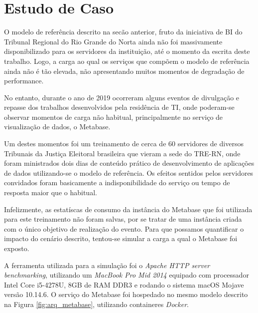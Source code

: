\section{Estudo de Caso}

O modelo de referência descrito na secão anterior, fruto da iniciativa de BI do Tribunal Regional do Rio Grande do Norta ainda não foi massivamente disponibilizado para os servidores da instituição, até o momento da escrita deste trabalho. Logo, a carga ao qual os serviços que compõem o modelo de referência ainda não é tão elevada, não apresentando muitos momentos de degradação de performance.

No entanto, durante o ano de 2019 ocorreram alguns eventos de divulgação e repasse dos trabalhos desenvolvidos pela residência de TI, onde poderam-se observar momentos de carga não habitual, principalmente no serviço de visualização de dados, o Metabase.

Um destes momentos foi um treinamento de cerca de 60 servidores de diversos Tribunais da Justiça Eleitoral brasileira que vieram a sede do TRE-RN, onde foram ministrados dois dias de conteúdo prático de desenvolvimento de aplicações de dados utilizando-se o modelo de referência. Os efeitos sentidos pelos servidores convidados foram basicamente a indisponibilidade do serviço ou tempo de resposta maior que o habitual.

Infelizmente, as estatíscas de consumo da instância do Metabase que foi utilizada para este treinamento não foram salvas, por se tratar de uma instância criada com o único objetivo de realização do evento. Para que possamos quantificar o impacto do cenário descrito, tentou-se simular a carga a qual o Metabase foi exposto.

A ferramenta utilizada para a simulação foi o \textit{Apache HTTP server benchmarking}, utilizando um \textit{MacBook Pro Mid 2014} equipado com processador Intel Core i5-4278U, 8GB de RAM DDR3 e rodando o sistema macOS Mojave versão 10.14.6. O serviço do Metabase foi hospedado no mesmo modelo descrito na Figura \ref{fig:arq_metabase}, utilizando containeres \textit{Docker}. 